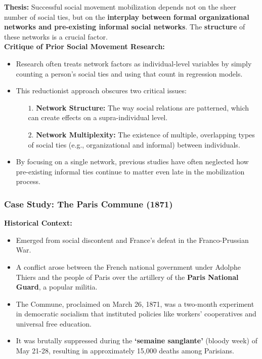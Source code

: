 \documentclass{article}
\begin{document}
    \noindent \textbf{Thesis:} Successful social movement mobilization
depends not on the sheer number of social ties, but on the
\textbf{interplay between formal organizational networks and pre-existing informal social networks}. The \textbf{structure} of these networks is a crucial factor.\\

    \noindent \textbf{Critique of Prior Social Movement Research:}
    \begin{itemize}
        \item Research often treats network factors as individual-level
        variables by simply counting a person's social ties and using that
        count in regression models.
        \item This reductionist approach obscures two critical issues:
        \begin{itemize}
            \item [$1$.] \textbf{Network Structure:} The way social
            relations are patterned, which can create effects on a
            supra-individual level.
            \item[$2$.] \textbf{Network Multiplexity:} The existence of
            multiple, overlapping types of social ties (e.g., organizational
            and informal) between individuals.
        \end{itemize}
        \item By focusing on a single network, previous studies have often
        neglected how pre-existing informal ties continue to matter even
        late in the mobilization process.
    \end{itemize}

    \subsubsection{Case Study: The Paris Commune (1871)}

    \noindent \textbf{Historical Context:}
    \begin{itemize}
        \item Emerged from social discontent and France's defeat in the Franco-Prussian War.
        \item A conflict arose between the French national government under
        Adolphe Thiers and the people of Paris over the artillery of the \textbf{Paris National Guard}, a popular militia.
        \item The Commune, proclaimed on March 26, 1871, was a two-month
        experiment in democratic socialism that instituted policies like
        workers' cooperatives and universal free education.
        \item It was brutally suppressed during the
        \textbf{`semaine sanglante'} (bloody week) of May 21-28, resulting
        in approximately 15,000 deaths among Parisians.
    \end{itemize}
\end{document}
